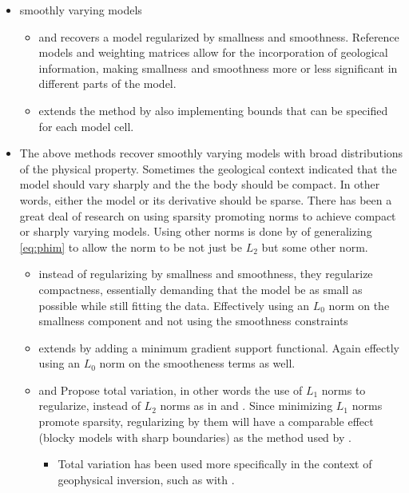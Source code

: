 \begin{itemize}
\item smoothly varying models
\begin{itemize}
\item \cite{li19963} and \cite{li19983}recovers a model regularized by smallness and smoothness. Reference models and weighting matrices allow for the incorporation of geological information, making smallness and smoothness more or less significant in different parts of the model.
\item \cite{li2003fast}  extends the method by also implementing bounds that can be specified for each model cell.
\end{itemize}
\item The above methods recover smoothly varying models with broad distributions of the physical property. Sometimes the geological context indicated that the model should vary sharply and the the body should be compact. In other words, either the model or its derivative should be sparse. There has been a great deal of research on using sparsity promoting norms to achieve compact or sharply varying models. Using other norms is done by of generalizing \autoref{eq:phim} to allow the norm to be not just be $L_2$ but some other norm.
\begin{itemize}	
\item \cite{last1983compact} instead of regularizing by smallness and smoothness, they regularize compactness, essentially demanding that the model be as small as possible while still fitting the data. Effectively using an $L_0$ norm on the smallness component and not using the smoothness constraints	
\item \cite{portniaguine1999focusing} extends  \cite{last1983compact} by adding a minimum gradient support functional. Again effectly using an $L_0$ norm on the smootheness terms as well.
\item \cite{rudin1992nonlinear} and \cite{vogel1998fast} Propose total variation, in other words the use of $L_1$ norms to regularize, instead of $L_2$ norms as in \cite{li19963} and \cite{li19983}. Since minimizing $L_1$ norms promote sparsity, regularizing by them will have a comparable effect (blocky models with sharp boundaries) as the method used by \cite{portniaguine1999focusing}.
	\begin{itemize}
		\item Total variation has been used more specifically in the context of geophysical inversion, such as with \cite{guitton2012blocky}.	
	\end{itemize}

\end{itemize}
\end{itemize}
